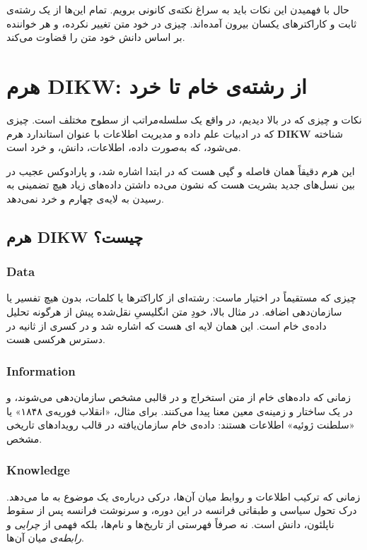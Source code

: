 حال با فهمیدن این نکات باید به سراغ نکته‌ی کانونی برویم. تمام این‌ها از یک رشته‌ی ثابت و کاراکترهای یکسان بیرون آمده‌اند. چیزی در خود متن تغییر نکرده، و هر خواننده بر اساس دانش خود متن را قضاوت می‌کند.

\section{هرم DIKW: از رشته‌ی خام تا خرد}
\label{sec:levels-of-data}

نکات و چیزی که در بالا دیدیم، در واقع یک سلسله‌مراتب از سطوح مختلف است. چیزی که در ادبیات علم داده و مدیریت اطلاعات با عنوان استاندارد هرم \textbf{DIKW} شناخته می‌شود، که به‌صورت داده، اطلاعات، دانش، و خرد است.

این هرم دقیقاً همان فاصله و گپی هست که در ابتدا اشاره شد، و پارادوکس عجیب در بین نسل‌های جدید بشریت هست که نشون می‌ده داشتن داده‌های زیاد هیچ تضمینی به رسیدن به لایه‌ی چهارم و خرد نمی‌دهد.

\subsection{هرم DIKW چیست؟}
\label{sub:what-is-dikw}

\subsubsection{Data}
چیزی که مستقیماً در اختیار ماست: رشته‌ای از کاراکترها یا کلمات، بدون هیچ تفسیر یا سازمان‌دهی اضافه. در مثال بالا، خودِ متن انگلیسیِ نقل‌شده  پیش از هرگونه تحلیل داده‌ی خام است. این همان لایه ای هست که اشاره شد و در کسری از ثانیه در دسترس هرکسی هست.

\subsubsection{Information}
زمانی که داده‌های خام از متن استخراج و در قالبی مشخص سازمان‌دهی می‌شوند، و در یک ساختار و زمینه‌ی معین معنا پیدا می‌کنند. برای مثال، «انقلاب فوریه‌ی ۱۸۴۸» یا «سلطنت ژوئیه» اطلاعات هستند: داده‌ی خام سازمان‌یافته در قالب رویدادهای تاریخی مشخص.

\subsubsection{Knowledge}
زمانی که ترکیب اطلاعات و روابط میان آن‌ها، درکی درباره‌ی یک موضوع به ما می‌دهد. درک تحول سیاسی و طبقاتی فرانسه در این دوره، و سرنوشت فرانسه پس از سقوط ناپلئون، دانش است. نه صرفاً فهرستی از تاریخ‌ها و نام‌ها، بلکه فهمی از \emph{چرایی} و \emph{رابطه‌ی} میان آن‌ها.

